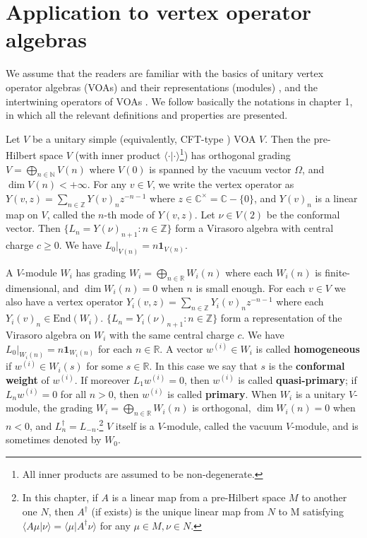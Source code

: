 \documentclass[12pt,a4paper]{article}
\theoremstyle{definition}
\theoremstyle{plain}
\newcommand{\End}{\mathrm{End}} %
\newcommand{\id}{\mathbf{1}}
\newcommand{\bk}[1]{\langle {#1}\rangle}
\newcommand{\mbb}{\mathbb}
\numberwithin{equation}{subsection}
\begin{document}
\section{Application to vertex operator algebras}



We assume that the readers are familiar with the basics of unitary vertex operator algebras (VOAs) and their representations (modules) \cite{CKLW18,DL14}, and the intertwining operators of VOAs \cite{FHL93}. We follow basically the notations in \cite{Gui19a} chapter 1, in which all the relevant definitions and properties are presented.

Let $V$ be a unitary simple (equivalently, CFT-type \cite{CKLW18}) VOA $V$. Then the pre-Hilbert space $V$ (with inner product $\bk{\cdot|\cdot}$\footnote{All inner products are assumed to be non-degenerate.}) has orthogonal grading $V=\bigoplus_{n\in\mbb N}V(n)$ where $V(0)$ is spanned by the vacuum vector $\Omega$, and $\dim V(n)<+\infty$. For any $v\in V$, we write the vertex operator as $Y(v,z)=\sum_{n\in\mbb Z}Y(v)_nz^{-n-1}$ where $z\in\mbb C^\times=\mbb C-\{0\}$, and $Y(v)_n$ is a linear map on $V$, called the $n$-th mode of $Y(v,z)$. Let $\nu\in V(2)$ be the conformal vector. Then $\{L_n=Y(\nu)_{n+1}:n\in\mbb Z\}$ form a Virasoro algebra with central charge $c\geq0$. We have $L_0|_{V(n)}=n\id_{V(n)}$.

A $V$-module $W_i$ has grading $W_i=\bigoplus_{n\in\mbb R}W_i(n)$ where each $W_i(n)$ is finite-dimensional, and $\dim W_i(n)=0$ when $n$ is small enough. For each $v\in V$ we also have a vertex operator $Y_i(v,z)=\sum_{n\in\mbb Z}Y_i(v)_nz^{-n-1}$ where each $Y_i(v)_n\in\End(W_i)$. $\{L_n=Y_i(\nu)_{n+1}:n\in\mbb Z\}$ form a representation of the Virasoro algebra on $W_i$ with the same central charge $c$. We have $L_0|_{W_i(n)}=n\id_{W_i(n)}$ for each $n\in\mbb R$. A vector $w^{(i)}\in W_i$ is called \textbf{homogeneous} if $w^{(i)}\in W_i(s)$ for some $s\in\mbb R$. In this case we say that $s$ is the \textbf{conformal weight} of $w^{(i)}$. If moreover $L_1w^{(i)}=0$, then $w^{(i)}$ is called \textbf{quasi-primary}; if $L_nw^{(i)}=0$ for all $n>0$, then $w^{(i)}$ is called \textbf{primary}. When $W_i$ is a unitary $V$-module, the grading $W_i=\bigoplus_{n\in\mbb R}W_i(n)$ is orthogonal, $\dim W_i(n)=0$ when $n<0$, and $L_n^\dagger=L_{-n}$.\footnote{In this chapter, if $A$ is a linear   map from a pre-Hilbert space $M$ to another one $N$, then $A^\dagger$ (if exists) is the unique linear  map from $N$ to M satisfying $\bk {A\mu|\nu}=\bk{\mu|A^\dagger\nu}$  for any $\mu\in M,\nu\in N$.} $V$ itself is a $V$-module, called the vacuum $V$-module, and is sometimes denoted by $W_0$.
\end{document}
